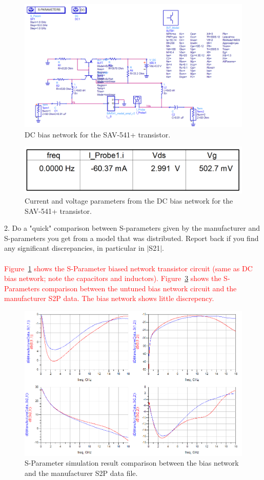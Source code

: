 \documentclass[conference]{IEEEtran}
\begin{document}
\begin{figure}[!h]
\centering
\includegraphics[scale=0.29]{pics/DCBiasNetwork.png}
\caption{DC bias network for the SAV-541+ transistor.}
\label{fig:dccircuit}
\end{figure}
\begin{figure}[!h]
\centering
\includegraphics[scale=0.21]{pics/DCBiasResults.png}
\caption{Current and voltage  parameters from the DC bias network for the SAV-541+ transistor.}
\label{fig:dcvalues}
\end{figure}
2. Do a "quick" comparison between S-parameters given by the manufacturer and S-parameters you get from a model that was distributed. Report back if you find any significant discrepancies, in particular in $|$S21$|$.\\\\
\textcolor{red}{Figure~\ref{fig:dccircuit} shows the S-Parameter biased network transistor circuit (same as DC bias network; note the capacitors and inductors).  Figure~\ref{fig:sparamresult} shows the S-Parameters comparison between the untuned bias network circuit and the manufacturer S2P data.  The bias network shows little discrepency.}
\begin{figure}[!h]
\centering
\includegraphics[scale=0.35]{pics/SParameterComparison.png}
\caption{S-Parameter simulation result comparison between the bias network and the manufacturer S2P data file.}
\label{fig:sparamresult}
\end{figure}
\end{document}
